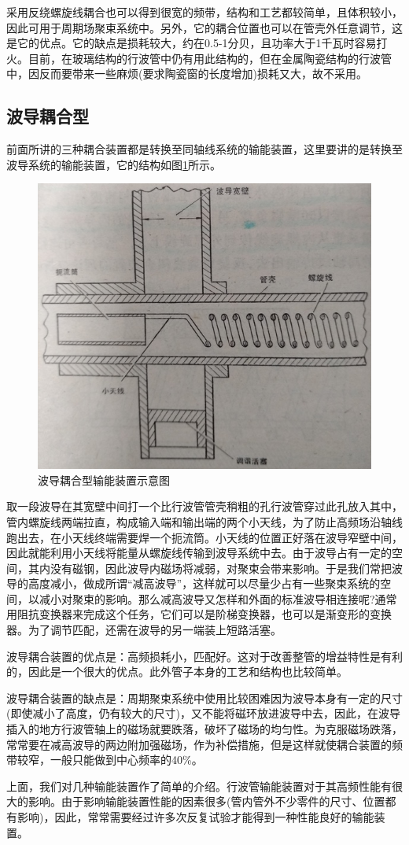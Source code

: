 采用反绕螺旋线耦合也可以得到很宽的频带，结构和工艺都较简单，且体积较小，因此可用于周期场聚束系统中。另外，它的耦合位置也可以在管壳外任意调节，这是它的优点。它的缺点是损耗较大，约在0.5-1分贝，且功率大于1千瓦时容易打火。目前，在玻璃结构的行波管中仍有用此结构的，但在金属陶瓷结构的行波管中，因反而要带来一些麻烦(要求陶瓷窗的长度增加)损耗又大，故不采用。
\subsection{波导耦合型}
前面所讲的三种耦合装置都是转换至同轴线系统的输能装置，这里要讲的是转换至波导系统的输能装置，它的结构如图\ref{ch9-5}所示。
\begin{figure}[phtb]
	\centering
	\includegraphics[width=0.75\linewidth]{figure/ch9-5}
	\caption{ 波导耦合型输能装置示意图}
	\label{ch9-5}
\end{figure}


取一段波导在其宽壁中间打一个比行波管管壳稍粗的孔行波管穿过此孔放入其中，管内螺旋线两端拉直，构成输入端和输出端的两个小天线，为了防止高频场沿轴线跑出去，在小天线终端需要焊一个扼流筒。小天线的位置正好落在波导窄壁中间，因此就能利用小天线将能量从螺旋线传输到波导系统中去。由于波导占有一定的空间，其内没有磁钢，因此波导内磁场将减弱，对聚束会带来影响。于是我们常把波导的高度减小，做成所谓“减高波导”，这样就可以尽量少占有一些聚束系统的空间，以减小对聚束的影响。那么减高波导又怎样和外面的标准波导相连接呢?通常用阻抗变换器来完成这个任务，它们可以是阶梯变换器，也可以是渐变形的变换器。为了调节匹配，还需在波导的另一端装上短路活塞。


波导耦合装置的优点是：高频损耗小，匹配好。这对于改善整管的增益特性是有利的，因此是一个很大的优点。此外管子本身的工艺和结构也比较简单。


波导耦合装置的缺点是：周期聚束系统中使用比较困难因为波导本身有一定的尺寸(即使减小了高度，仍有较大的尺寸)，又不能将磁环放进波导中去，因此，在波导插入的地方行波管轴上的磁场就要跌落，破坏了磁场的均匀性。为克服磁场跌落，常常要在减高波导的两边附加强磁场，作为补偿措施，但是这样就使耦合装置的频带较窄，一般只能做到中心频率的40\%。


上面，我们对几种输能装置作了简单的介绍。行波管输能装置对于其高频性能有很大的影响。由于影响输能装置性能的因素很多(管内管外不少零件的尺寸、位置都有影响)，因此，常常需要经过许多次反复试验才能得到一种性能良好的输能装置。
